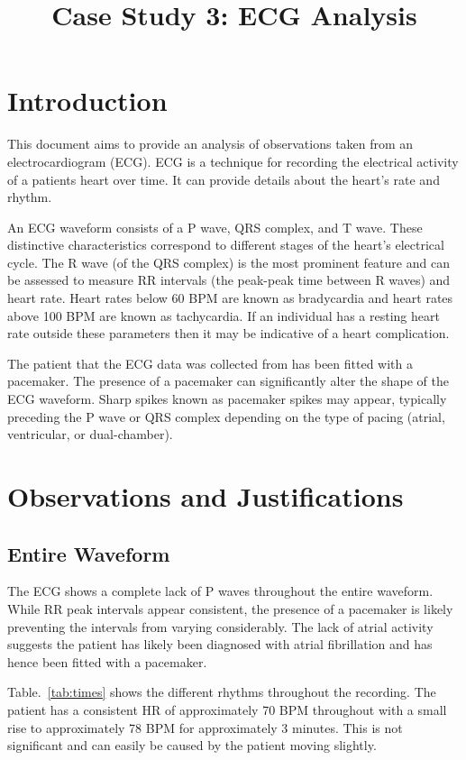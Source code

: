 \documentclass[conference]{IEEEtran}
\title{Case Study 3: ECG Analysis}
\date{}
\begin{document}
\justifying

\maketitle

\section{Introduction} 

This document aims to provide an analysis of observations taken from an electrocardiogram (ECG). ECG is a technique for recording the electrical activity of a patients heart over time. It can provide details about the heart's rate and rhythm.

An ECG waveform consists of a P wave, QRS complex, and T wave. These distinctive characteristics correspond to different stages of the heart's electrical cycle. The R wave (of the QRS complex) is the most prominent feature and can be assessed to measure RR intervals (the peak-peak time between R waves) and heart rate. Heart rates below 60 BPM are known as bradycardia and heart rates above 100 BPM are known as tachycardia. If an individual has a resting heart rate outside these parameters then it may be indicative of a heart complication.

The patient that the ECG data was collected from has been fitted with a pacemaker. The presence of a pacemaker can significantly alter the shape of the ECG waveform. Sharp spikes known as pacemaker spikes may appear, typically preceding the P wave or QRS complex depending on the type of pacing (atrial, ventricular, or dual-chamber).

\section{Observations and Justifications}

\subsection{Entire Waveform}

The ECG shows a complete lack of P waves throughout the entire waveform. While RR peak intervals appear consistent, the presence of a pacemaker is likely preventing the intervals from varying considerably. The lack of atrial activity suggests the patient has likely been diagnosed with atrial fibrillation and has hence been fitted with a pacemaker.

Table.~\ref{tab:times} shows the different rhythms throughout the recording. The patient has a consistent HR of approximately 70 BPM throughout with a small rise to approximately 78 BPM for approximately 3 minutes. This is not significant and can easily be caused by the patient moving slightly.
\end{document}
